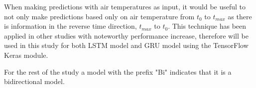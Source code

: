 When making predictions with air temperatures as input, it would be useful to not only make predictions based only on air temperature from $t_0$ to $t_{max}$ as there is information in the reverse time direction, $t_{max}$ to $t_0$. This technique has been applied in other studies with noteworthy performance increase, therefore will be used in this study for both LSTM model and GRU model using the TensorFlow Keras module. 

For the rest of the study a model with the prefix "Bi" indicates that it is a bidirectional model.
